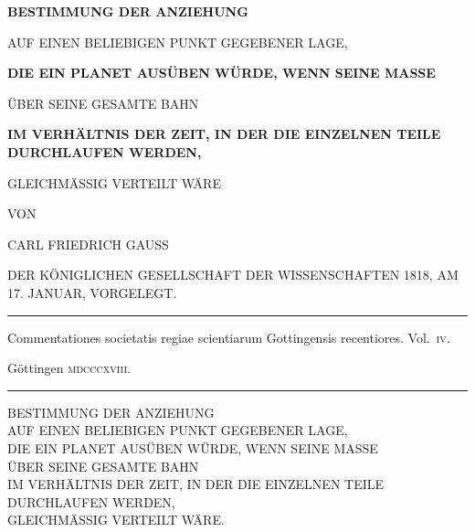 \begingroup
\renewcommand{\arraystretch}{1.45}
\clearpage{}\thispagestyle{empty}
\vspace*{1.5em}
\begin{center}
\textbf{BESTIMMUNG DER ANZIEHUNG}

AUF EINEN BELIEBIGEN PUNKT GEGEBENER LAGE,

\textbf{DIE EIN PLANET AUSÜBEN WÜRDE, WENN SEINE MASSE}

ÜBER SEINE GESAMTE BAHN

\textbf{IM VERHÄLTNIS DER ZEIT, IN DER DIE EINZELNEN TEILE DURCHLAUFEN WERDEN,}

GLEICHMÄSSIG VERTEILT WÄRE

\bigskip
VON

\bigskip
CARL FRIEDRICH GAUSS

\bigskip
DER KÖNIGLICHEN GESELLSCHAFT DER WISSENSCHAFTEN 1818, AM 17. JANUAR, VORGELEGT.

\bigskip
\rule{0.7\linewidth}{0.4pt}

Commentationes societatis regiae scientiarum Gottingensis recentiores. Vol.~\textsc{iv}.

Göttingen \textsc{mdcccxviii}.

\rule{0.7\linewidth}{0.4pt}
\end{center}
\clearpage{}
{\small\begin{center}
BESTIMMUNG DER ANZIEHUNG\\
AUF EINEN BELIEBIGEN PUNKT GEGEBENER LAGE,\\
DIE EIN PLANET AUSÜBEN WÜRDE, WENN SEINE MASSE\\
ÜBER SEINE GESAMTE BAHN\\
IM VERHÄLTNIS DER ZEIT, IN DER DIE EINZELNEN TEILE DURCHLAUFEN WERDEN,\\
GLEICHMÄSSIG VERTEILT WÄRE.
\end{center}}

